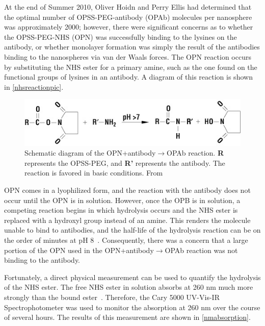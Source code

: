 At the end of Summer 2010, Oliver Hoidn and Perry Ellis had determined that the optimal number of OPSS-PEG-antibody (OPAb) molecules per nanosphere was approximately 2000; however, there were significant concerns as to whether the OPSS-PEG-NHS (OPN) was successfully binding to the lysines on the antibody, or whether monolayer formation was simply the result of the antibodies binding to the nanospheres via van der Waals forces. The OPN reaction occurs by substituting the NHS ester for a primary amine, such as the one found on the functional groups of lysines in an antibody. A diagram of this reaction is shown in \autoref{nhsreactionpic}.

\begin{figure}[htbp]
\centering
\includegraphics[keepaspectratio,width=\textwidth,height=0.75\textheight]{NHSreaction.jpg}
\caption{Schematic diagram of the OPN+antibody$\to$OPAb reaction. \textbf{R} represents the OPSS-PEG, and \textbf{R'} represents the antibody. The reaction is favored in basic conditions. From ~\citep{nhsreaction}}
\label{nhsreactionpic}
\end{figure}



OPN comes in a lyophilized form, and the reaction with the antibody does not occur until the OPN is in solution. However, once the OPB is in solution, a competing reaction begins in which hydrolysis occurs and the NHS ester is replaced with a hydroxyl group instead of an amine. This renders the molecule unable to bind to antibodies, and the half-life of the hydrolysis reaction can be on the order of minutes at pH 8~\citep{nhshalflife}. Consequently, there was a concern that a large portion of the OPN used in the OPN+antibody$\to$OPAb reaction was not binding to the antibody.

Fortunately, a direct physical measurement can be used to quantify the hydrolysis of the NHS ester. The free NHS ester in solution absorbs at 260 nm much more strongly than the bound ester~\citep{Miron_Wilchek_1982}. Therefore, the Cary 5000 UV-Vis-IR Spectrophotometer was used to monitor the absorption at 260 nm over the course of several hours. The results of this measurement are shown in \autoref{nmabsorption}.

